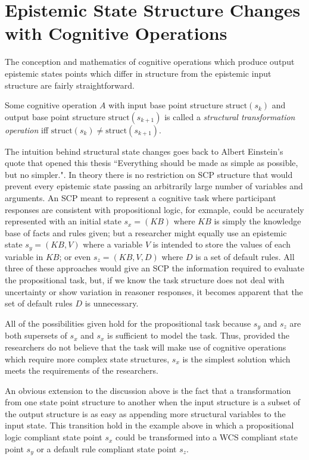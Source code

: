 \section{Epistemic State Structure Changes with Cognitive Operations}
The conception and mathematics of cognitive operations which produce output epistemic states points which differ in structure from the epistemic input structure are fairly straightforward.

Some cognitive operation $A$ with input base point structure $\textrm{struct}(s_k)$ and output base point structure $\textrm{struct}(s_{k+1})$ is called a \textit{structural transformation operation} iff $\textrm{struct}(s_k) \ne \textrm{struct}(s_{k+1})$.

The intuition behind structural state changes goes back to Albert Einstein's quote that opened this thesis ``Everything should be made as simple as possible, but no simpler.". In theory there is no restriction on SCP structure that would prevent every epistemic state passing an arbitrarily large number of variables and arguments. An SCP meant to represent a cognitive task where participant responses are consistent with propositional logic, for exmaple, could be accurately represented with an initial state $s_x=(KB)$ where $KB$ is simply the knowledge base of facts and rules given; but a researcher might equally use an epistemic state $s_y=(KB,V)$ where a variable $V$ is intended to store the values of each variable in $KB$; or even $s_z=(KB,V,D)$ where $D$ is a set of default rules. All three of these approaches would give an SCP the information required to evaluate the propositional task, but, if we know the task structure does not deal with uncertainty or show variation in reasoner responses, it becomes apparent that the set of default rules $D$ is unnecessary.

All of the possibilities given hold for the propositional task because $s_y$ and $s_z$ are both supersets of $s_x$ and $s_x$ is sufficient to model the task. Thus, provided the researchers do not believe that the task will make use of cognitive operations which require more complex state structures, $s_x$ is the simplest solution which meets the requirements of the researchers.

An obvious extension to the discussion above is the fact that a transformation from one state point structure to another when the input structure is a subset of the output structure is as easy as appending more structural variables to the input state. This transition hold in the example above in which a propositional logic compliant state point $s_x$ could be transformed into a WCS compliant state point $s_y$ or a default rule compliant state point $s_z$.

